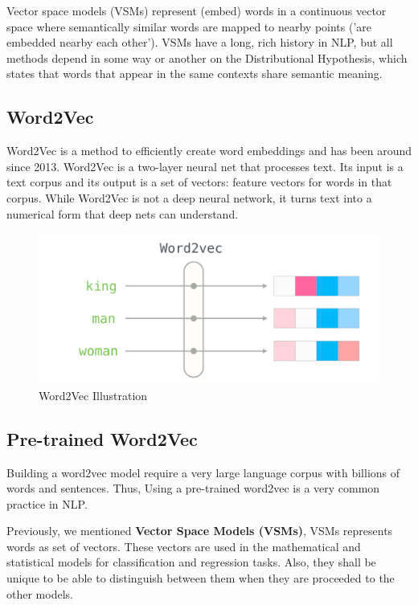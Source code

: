 Vector space models (VSMs) represent (embed) words in a continuous vector space where semantically similar words are mapped to nearby points ('are embedded nearby each other'). VSMs have a long, rich history in NLP, but all methods depend in some way or another on the Distributional Hypothesis, which states that words that appear in the same contexts share semantic meaning.

\subsection{Word2Vec}

Word2Vec is a method to efficiently create word embeddings and has been around since 2013. Word2Vec is a two-layer neural net that processes text. Its input is a text corpus and its output is a set of vectors: feature vectors for words in that corpus. While Word2Vec is not a deep neural network, it turns text into a numerical form that deep nets can understand.

\begin{figure}[ht]
    \centering
    \includegraphics[scale=0.3]{Images/word2vec.png}
    \caption{Word2Vec Illustration}
    \label{fig:w2v}
\end{figure}

\vspace{3cm}

\subsection{Pre-trained Word2Vec}
Building a word2vec model require a very large language corpus with billions of words and sentences. Thus, Using a pre-trained word2vec is a very common practice in NLP.

Previously, we mentioned \textbf{Vector Space Models (VSMs)}, VSMs represents words as set of vectors. These vectors are used in the mathematical and statistical models for classification and regression tasks. Also, they shall be unique to be able to distinguish between them when they are proceeded to the other models.

